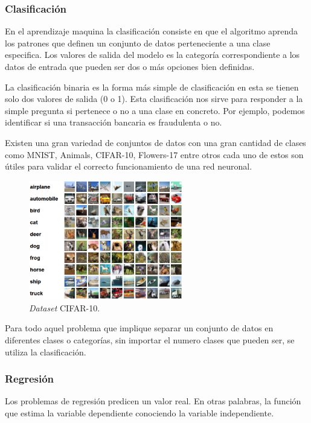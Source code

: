 \subsubsection{Clasificación}

En el aprendizaje maquina la clasificación consiste en que el algoritmo aprenda los patrones que definen un conjunto de datos perteneciente a una clase especifica. Los valores de salida del modelo es la categoría correspondiente a los datos de entrada que pueden ser dos o más opciones bien definidas.

La clasificación binaria es la forma más simple de clasificación en esta se tienen solo dos valores de salida (0 o 1). Esta clasificación nos sirve para responder a la simple pregunta si pertenece o no a una clase en concreto. Por ejemplo, podemos identificar si una transacción bancaria es fraudulenta o no.

Existen una gran variedad de conjuntos de datos con una gran cantidad de clases como MNIST, Animals, CIFAR-10, Flowers-17 entre otros cada uno de estos son útiles para validar el correcto funcionamiento de una red neuronal.

\begin{figure}[H]
    \centering
    \includegraphics[width=0.6\textwidth]{MarcoTeorico/imgs/CIFAR-10.png}
    \caption{\textit{Dataset} CIFAR-10.}
    \label{fig:cifar10}
\end{figure}

Para todo aquel problema que implique separar un conjunto de datos en diferentes clases o categorías, sin importar el numero clases que pueden ser, se utiliza la clasificación.

\subsubsection{Regresión}

Los problemas de regresión predicen un valor real. En otras palabras, la función que estima la variable dependiente conociendo la variable independiente.


